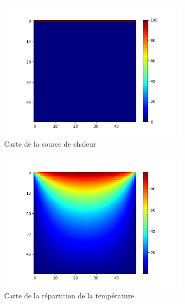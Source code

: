 \documentclass{article}
\begin{document}
\begin{figure}[ht]
  \centering
  \begin{subfigure}{0.3\textwidth}
    \centering
    \includegraphics[width=\linewidth]{Chaleur_2.png}
    \caption{Carte de la source de chaleur}
    \label{subfig:heat_wall_prev}
  \end{subfigure}
  \hfill
  \begin{subfigure}{0.3\textwidth}
    \centering
    \includegraphics[width=\linewidth]{Chaleur_2b.png}
    \caption{Carte de la répartition de la température}
    \label{subfig:heat_wall_temp}
  \end{subfigure}
  \hfill
  \begin{subfigure}{0.3\textwidth}

\end{subfigure}
\end{figure}
\end{document}
